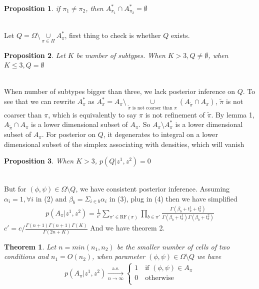 \documentclass[11pt]{amsart}
\newtheorem{theorem}{Theorem}
\newtheorem{prop}{Proposition}
\begin{document}
\begin{prop}
if $\pi_1 \neq \pi_2$, then $A_{\pi_1}^*\cap A_{\pi_2}^* = \emptyset$
\end{prop}
\hfill\\
Let $Q = \Omega\setminus \underset{\pi\in \Pi}\cup A_\pi^*$, first thing to check is whether $Q$ exists.\\
\begin{prop}
Let $K$ be number of subtypes. When $K >  3, Q \neq \emptyset$, when $K \leq 3, Q = \emptyset$
\end{prop}
\hfill\\
When number of subtypes bigger than three, we lack posterior inference on $Q$. To see that we can rewrite $A_\pi^*$ as $A_\pi^* = A_\pi\setminus \underset{\tilde{\pi} \text{ is not coarser than } \pi }\cup (A_{\tilde{\pi}}\cap A_\pi)$, $\tilde{\pi}$ is not coarser than $\pi$, which is equivalently to say $\pi$ is not refinement of $\tilde{\pi}$. By lemma 1, $A_{\tilde{\pi}}\cap A_\pi$ is a lower dimensional subset of $A_\pi$. So $A_\pi \setminus A_\pi^*$ is a lower dimensional subset of $A_\pi$. For posterior on $Q$, it degenerates to integral on a lower dimensional subset of the simplex associating with densities, which will vanish\\
\begin{prop}
When $K >  3$, $p(Q | z^1, z^2) = 0$
\end{prop}
\hfill\\
But for $(\phi, \psi)\in \Omega\setminus Q$, we have consistent posterior inference. Assuming $\alpha_i = 1, \forall i$ in (2) and $\beta_b = \Sigma_{i\in b} \alpha_i$ in (3), plug in (4) then we have simplified 
\begin{align}
p(A_\pi| z^1, z^2) = \frac{1}{c'}\sum_{\pi' \in \text{RF}(\pi)}\prod_{b\in \pi'}\frac{ \Gamma(\beta_b + t_b^1 + t_b^2)}{\Gamma(\beta_b + t_b^1)\Gamma(\beta_b + t_b^2)}
\end{align}
$c' = c/\frac{\Gamma(n + 1)\Gamma(n+1)\Gamma(K)}{\Gamma(2n + K)}$ And we have theorem 2.\\
\begin{theorem} Let $n = min(n_1, n_2)$ be the smaller number of cells of two conditions and $n_1 = O(n_2)$, when parameter $(\phi, \psi)\in \Omega\setminus Q $ we have 
\begin{eqnarray*}
    p(A_{\pi} | z^1, z^2) \xrightarrow[n\rightarrow\infty]{\text{a.s.}}\left\{
                \begin{array}{ll}
                 1 \quad \text{if }(\phi,\psi) \in A_\pi\\
                 0 \quad \text{otherwise}\\             
                \end{array}
              \right.
\end{eqnarray*}
\end{theorem}
\end{document}
